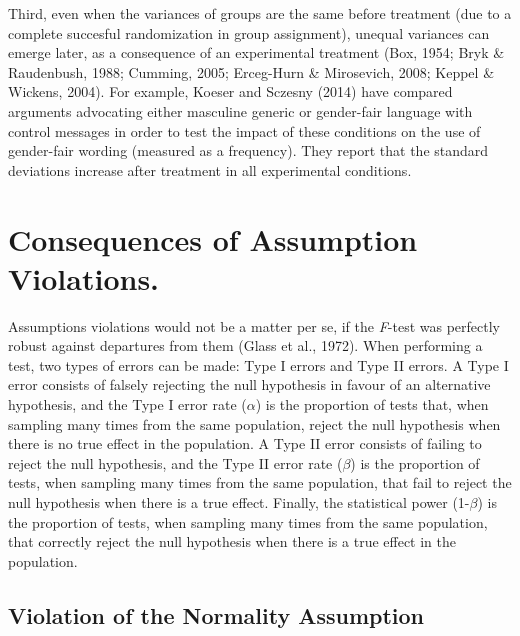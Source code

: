 \documentclass[man,floatsintext]{apa6}
\begin{document}
Third, even when the variances of groups are the same before treatment (due to a complete succesful randomization in group assignment), unequal variances can emerge later, as a consequence of an experimental treatment (Box, 1954; Bryk \& Raudenbush, 1988; Cumming, 2005; Erceg-Hurn \& Mirosevich, 2008; Keppel \& Wickens, 2004). For example, Koeser and Sczesny (2014) have compared arguments advocating either masculine generic or gender-fair language with control messages in order to test the impact of these conditions on the use of gender-fair wording (measured as a frequency). They report that the standard deviations increase after treatment in all experimental conditions.

\hypertarget{consequences-of-assumption-violations.}{%
\section{Consequences of Assumption Violations.}\label{consequences-of-assumption-violations.}}

Assumptions violations would not be a matter per se, if the \emph{F}-test was perfectly robust against departures from them (Glass et al., 1972). When performing a test, two types of errors can be made: Type I errors and Type II errors. A Type I error consists of falsely rejecting the null hypothesis in favour of an alternative hypothesis, and the Type I error rate (\(\alpha\)) is the proportion of tests that, when sampling many times from the same population, reject the null hypothesis when there is no true effect in the population. A Type II error consists of failing to reject the null hypothesis, and the Type II error rate (\(\beta\)) is the proportion of tests, when sampling many times from the same population, that fail to reject the null hypothesis when there is a true effect. Finally, the statistical power (1-\(\beta\)) is the proportion of tests, when sampling many times from the same population, that correctly reject the null hypothesis when there is a true effect in the population.

\hypertarget{violation-of-the-normality-assumption}{%
\subsection{Violation of the Normality Assumption}\label{violation-of-the-normality-assumption}}
\end{document}
